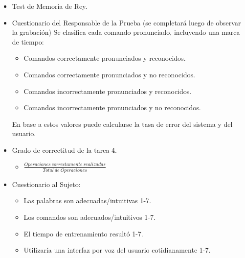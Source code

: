 \begin{itemize}
    \item Test de Memoria de Rey.
    \item Cuestionario del Responsable de la Prueba (se completar\'a luego de observar la grabaci\'on)
    Se clasifica cada comando pronunciado, incluyendo una marca de tiempo:
    \begin{itemize}
        \item Comandos correctamente pronunciados y reconocidos.
        \item Comandos correctamente pronunciados y no reconocidos.
        \item Comandos incorrectamente pronunciados y reconocidos.
        \item Comandos incorrectamente pronunciados y no reconocidos.
    \end{itemize}
    En base a estos valores puede calcularse la tasa de error del sistema y del usuario.
    \item Grado de correctitud de la tarea 4.
    \begin{itemize}
    \item $ \frac{Operaciones \:correctamente \:realizadas}{Total \:de \:Operaciones}$
    \end{itemize}
    \item Cuestionario al Sujeto:
    \begin{itemize}
        \item Las palabras son adecuadas/intuitivas 1-7.
        \item Los comandos son adecuados/intuitivos 1-7.
        \item El tiempo de entrenamiento result\'o 1-7.
        \item Utilizaría una interfaz por voz del usuario cotidianamente 1-7.
    \end{itemize}
\end{itemize}

